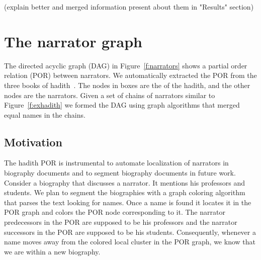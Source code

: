 \documentclass[11pt]{article}
\begin{document}
(explain better and merged information present about them in "Results" section)

\section{The narrator graph}
\label{sec:graph}

\begin{figure}[tb]
\end{figure}

The directed acyclic graph (DAG) 
in Figure~\ref{f:narrators} shows a partial order 
relation (POR) between narrators.
We automatically extracted the POR from the three books of 
hadith~\cite{IbnHanbal,AlKulayni,AlTousi}.
The nodes in boxes are the  of the hadith, 
and the other nodes are the narrators.
Given a set of chains of narrators similar to 
Figure~\ref{f:exhadith} we formed the DAG using graph algorithms 
that merged equal names in the chains. 

\subsection{Motivation}

The hadith POR is instrumental to automate
localization of narrators in biography documents and
to segment biography documents in future work.
Consider a biography that discusses a narrator.
It mentions his professors and students.
We plan to segment the biographies with a graph 
coloring algorithm
that parses the text looking for names. 
Once a name is found it locates it in the POR graph
and colors the POR node corresponding
to it.
The narrator predecessors in the POR are supposed to be
his professors and the narrator successors in the POR 
are supposed to be his students. 
Consequently, whenever a name moves away from the 
colored local cluster in the POR graph, 
we know that we are within a new biography. 
\end{document}
